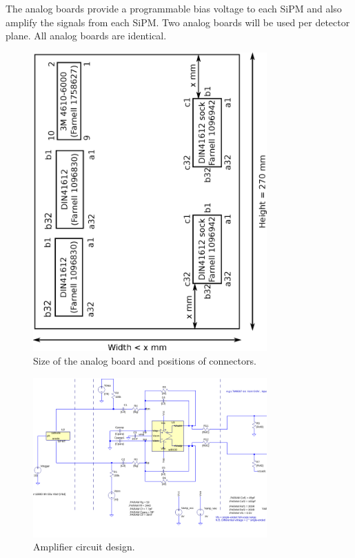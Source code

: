 \documentclass[a4paper]{article}
\begin{document}
The analog boards provide a programmable bias voltage to each SiPM and also amplify the signals from each SiPM.
Two analog boards will be used per detector plane.
All analog boards are identical.

\begin{figure}[h]
    \begin{center}
        \includegraphics[width=0.8\textwidth]{imgs/analogboardsize}
        \caption{Size of the analog board and positions of connectors.}
        \label{fig:analogboardsize}
    \end{center}
\end{figure}

\begin{figure}[h]
    \begin{center}
        \includegraphics[width=0.8\textwidth]{imgs/SiPM_test_dc_schematic}
        \caption{Amplifier circuit design.}
        \label{fig:amplifiercircuit}
    \end{center}
\end{figure}
\end{document}
